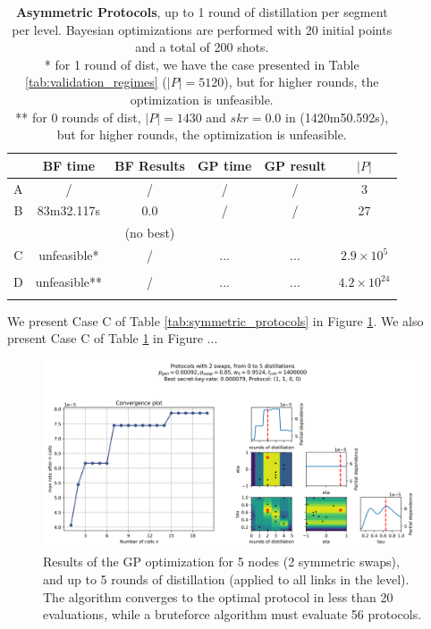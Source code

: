 \documentclass{article}
\begin{document}
\begin{table}[ht!]
    \centering
    \begin{tabular}{|c|c|c|c|c|c|}
        \hline
        & BF time & BF Results & GP time & GP result & $|P|$ \\
        \hline
        \hline
        A & / & / & / & / & 3 \\
        \hline
        B & 83m32.117s & 0.0 & / & / & 27 \\
          & & (no best) & & & \\
        \hline
        C & unfeasible* & / & ... & ... & $2.9 \times 10^{5}$ \\
          & & & & & \\
        \hline
        D & unfeasible** & / & ... & ... & $4.2 \times 10^{24}$ \\
          & & & & & \\
        \hline
    \end{tabular}
    \caption{\textbf{Asymmetric Protocols}, up to 1 round of distillation per segment per level. 
    Bayesian optimizations are performed with 20 initial points and a total of 200 shots. \\ * for 1 round of dist, we have the case presented in Table \ref{tab:validation_regimes} ($|P| = 5120$), but for higher rounds, the optimization is unfeasible. \\ ** for 0 rounds of dist, $|P| = 1430$ and $skr=0.0$ in (1420m50.592s), but for higher rounds, the optimization is unfeasible.}
    \label{tab:asymmetric_protocols}
\end{table}

We present Case C of Table \ref{tab:symmetric_protocols} in Figure \ref{fig:symmetric_5_nodes}. We also present Case C of Table \ref{tab:asymmetric_protocols} in Figure ... %

\begin{figure}[ht!]
  \centering
  \includegraphics[width=\linewidth]{symmetric/results_gp_centerspace/0.9524_2_swaps_skopt_gp.png}  
  \caption{Results of the GP optimization for 5 nodes (2 symmetric swaps), and up to 5 rounds of distillation (applied to all links in the level). The algorithm converges to the optimal protocol in less than 20 evaluations, while a bruteforce algorithm must evaluate 56 protocols.}
  \label{fig:symmetric_5_nodes}
\end{figure}
\end{document}

